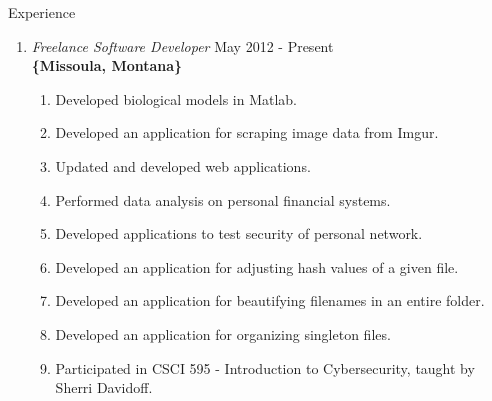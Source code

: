 \documentclass[oneside]{article}%
\begin{document}

\renewcommand{\footrulewidth}{1pt}


\noindent
\huge{Experience}
\normalsize
\begin{enumerate}[]
	\item \textit{Freelance Software Developer} \hfill May 2012 - Present\\
		\textbf{\{Missoula, Montana\}}
		\begin{enumerate}[*]
			\item Developed biological models in Matlab.
			\item Developed an application for scraping image data from Imgur.
			\item Updated and developed web applications.
			\item Performed data analysis on personal financial systems.
			\item Developed applications to test security of personal network.
			\item Developed an application for adjusting hash values of a given file.
			\item Developed an application for beautifying filenames in an entire folder.
			\item Developed an application for organizing singleton files.
			\item Participated in CSCI 595 - Introduction to Cybersecurity, taught by Sherri Davidoff.
		\end{enumerate}


\end{enumerate}
\end{document}
